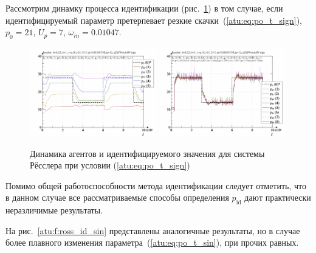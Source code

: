 Рассмотрим динамку процесса идентификации
(рис.~\ref{atu:f:ross_id_sign})
в том случае,
если идентифицируемый параметр претерпевает
резкие скачки~(\ref{atu:eq:po_t_sign}), $p_0=21$, $U_p=7$, $\omega_{in}=0.01047$.

\begin{figure}[ht!]
\begin{center}
  \includegraphics[width=0.49\textwidth]{p/cha/ross/ross_id-p_t_pi_ql3rlWvnAAW_sign.png}
  \hfill
  \includegraphics[width=0.49\textwidth]{p/cha/ross/ross_id-p_t_p_ql3rlWvnAAW_sign.png}
\end{center}
  \caption{Динамика агентов и идентифицируемого значения для системы Рёсслера при условии (\ref{atu:eq:po_t_sign})}
\label{atu:f:ross_id_sign}
\end{figure}

Помимо общей работоспособности метода идентификации следует отметить,
что в данном случае все рассматриваемые способы определения $p_\mathrm{id}$
дают практически неразличимые результаты.

На рис.~\ref{atu:f:ross_id_sin}
представлены аналогичные результаты,
но в случае более плавного изменения параметра~(\ref{atu:eq:po_t_sin}), при прочих равных.


